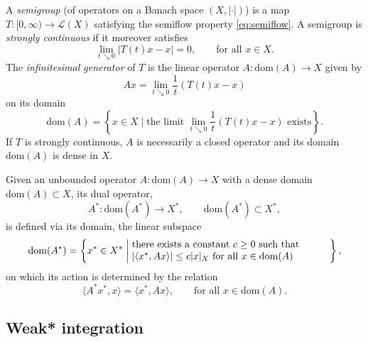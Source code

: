 \documentclass[a4paper, 12pt, oneside, reqno, notitlepage]{amsart}
\theoremstyle{plain}
\theoremstyle{definition}
\theoremstyle{remark}
\newcommand{\dom}{\mathrm{dom}}
\begin{document}
A \textit{semigroup} (of operators on a Banach space $(X,|\cdot|)$) is a map $T: [0,\infty) \to \mathcal{L}(X)$ satisfying the semiflow property \eqref{eq:semiflow}.
A semigroup is \textit{strongly continuous} if it moreover satisfies
\begin{displaymath}
    \lim_{t \searrow 0}\vert T(t) x - x \vert = 0, \qquad \text{for all } x \in X.
\end{displaymath}
The \textit{infinitesimal generator} of $T$ is the linear operator $A : \mathrm{dom}(A) \to X$ given by
\begin{equation}
    Ax = \lim_{t \searrow 0} \frac1t (T(t) x - x)
    \label{eq:generator_sg}
\end{equation}
on its domain 
\begin{displaymath}
    \dom(A) = \left\{x \in X \; \Big| \; \text{the limit } \lim_{t \searrow 0} \frac1t (T(t) x - x) \text{ exists} \right\}.
\end{displaymath}
If $T$ is strongly continuous, $A$ is necessarily a closed operator and its domain $\dom(A)$ is dense in $X$. 

Given an unbounded operator $A:\dom(A) \to X$ with a dense domain $\dom(A) \subset X$, 
its dual operator,
\begin{displaymath}
    A^* : \dom(A^*) \to X^*, \qquad \dom(A^*) \subset X^*,
\end{displaymath}
is defined via its domain, the linear subspace
\begin{equation}
    \dom(A^*) = \left\{ x^* \in X^* \; \bigg| \; \parbox{7cm}{there exists a constant $c \geq 0$ such that \\ $|\langle x^*,Ax\rangle| \leq c |x|_X$ for all $x \in \dom(A)$}  \right\},
    \label{eq:dual_domain}
\end{equation}
on which its action is determined by the relation
\begin{displaymath}
    \langle A^* x^*,x \rangle = \langle x^*,Ax\rangle, \qquad \text{for all } x \in \dom(A). 
\end{displaymath}


\subsection{Weak* integration}
\label{sect:weakstar_int}
\end{document}

